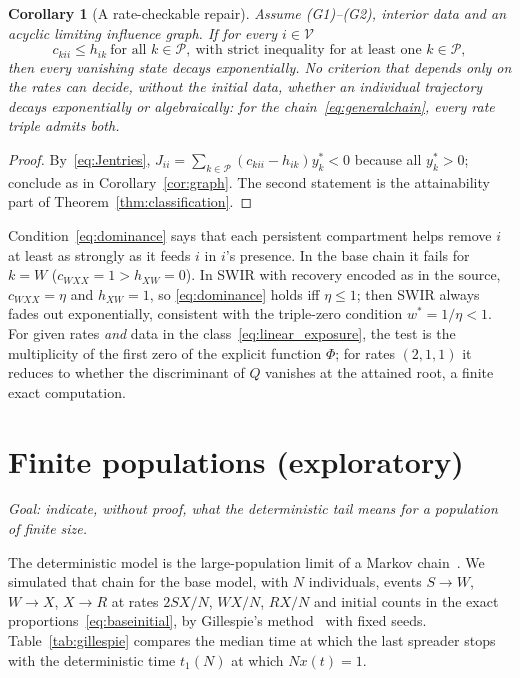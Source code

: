 \documentclass[11pt,a4paper]{article}
\newtheorem{corollary}[theorem]{Corollary}
\theoremstyle{definition}\newtheorem{definition}[theorem]{Definition}
\theoremstyle{remark}\newtheorem{remark}[theorem]{Remark}
\newcommand{\Vs}{\mathcal V}
\newcommand{\Ps}{\mathcal P}
\begin{document}
\begin{corollary}[A rate-checkable repair]
\label{cor:rates}
Assume (G1)--(G2), interior data and an acyclic limiting influence graph.
If for every $i\in\Vs$
\begin{equation}
c_{kii}\le h_{ik}\ \text{for all }k\in\Ps,\ \text{with strict inequality for at least one }k\in\Ps,
\label{eq:dominance}
\end{equation}
then every vanishing state decays exponentially. No criterion that
depends only on the rates can decide, without the initial data, whether
an individual trajectory decays exponentially or algebraically: for the
chain~\eqref{eq:generalchain}, every rate triple admits both.
\end{corollary}
\begin{proof}
By~\eqref{eq:Jentries}, $J_{ii}=\sum_{k\in\Ps}(c_{kii}-h_{ik})y_k^*<0$
because all $y_k^*>0$; conclude as in Corollary~\ref{cor:graph}. The
second statement is the attainability part of
Theorem~\ref{thm:classification}.
\end{proof}
Condition~\eqref{eq:dominance} says that each persistent compartment
helps remove $i$ at least as strongly as it feeds $i$ in $i$'s presence.
In the base chain it fails for $k=W$ ($c_{WXX}=1>h_{XW}=0$). In SWIR with
recovery encoded as in the source, $c_{WXX}=\eta$ and $h_{XW}=1$, so
\eqref{eq:dominance} holds iff $\eta\le1$; then SWIR always fades out
exponentially, consistent with the triple-zero condition $w^*=1/\eta<1$.
For given rates \emph{and} data in the class~\eqref{eq:linear_exposure},
the test is the multiplicity of the first zero of the explicit function
$\Phi$; for rates $(2,1,1)$ it reduces to whether the discriminant of
$Q$ vanishes at the attained root, a finite exact computation.

\section{Finite populations (exploratory)}
\label{sec:finite}

\emph{Goal: indicate, without proof, what the deterministic tail means
for a population of finite size.}

The deterministic model is the large-population limit of a Markov
chain~\cite{Kurtz}. We simulated that chain for the base model, with
$N$ individuals, events $S\to W$, $W\to X$, $X\to R$ at rates $2SX/N$,
$WX/N$, $RX/N$ and initial counts in the exact
proportions~\eqref{eq:baseinitial}, by Gillespie's
method~\cite{Gillespie} with fixed seeds. Table~\ref{tab:gillespie}
compares the median time at which the last spreader stops with the
deterministic time $t_1(N)$ at which $Nx(t)=1$.
\end{document}
